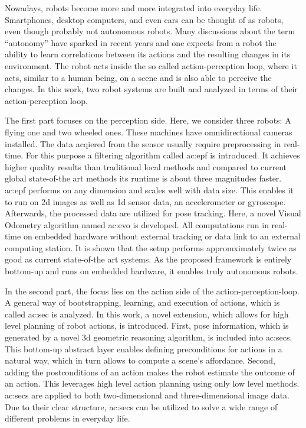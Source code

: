 Nowadays, robots become more and more integrated into everyday life.
Smartphones, desktop computers, and even cars can be thought of as robots, even though probably not autonomous robots.
Many discussions about the term ``autonomy'' have sparked in recent years and one expects from a robot the ability to learn correlations between its actions and the resulting changes in its environment.
The robot acts inside the so called action-perception loop, where it acts, similar to a human being, on a scene and is also able to perceive the changes.
In this work, two robot systems are built and analyzed in terms of their action-perception loop.

The first part focuses on the perception side.
Here, we consider three robots: A flying one and two wheeled ones.
These machines have omnidirectional cameras installed.
The data acqiered from the sensor usually require preprocessing in real-time.
For this purpose a filtering algorithm called \gls{ac:epf} is introduced.
It achieves higher quality results than traditional local methods and compared to current global state-of-the art methods its runtime is about three magnitudes faster.
\gls{ac:epf} performs on any dimension and scales well with data size.
This enables it to run on 2d images as well as 1d sensor data, \eg an accelerometer or gyroscope.
Afterwards, the processed data are utilized for pose tracking.
Here, a novel Visual Odometry algorithm named \gls{ac:evo} is developed.
All computations run in real-time on embedded hardware without external tracking or data link to an external computing station.
It is shown that the setup performs appromximately twice as good as current state-of-the art systems.
As the proposed framework is entirely bottom-up and runs on embedded hardware, it enables truly autonomous robots.

In the second part, the focus lies on the action side of the action-perception-loop.
A general way of bootstrapping, learning, and execution of actions, which is called \gls{ac:sec} is analyzed.
In this work, a novel extension, which allows for high level planning of robot actions, is introduced.
First, pose information, which is generated by a novel 3d geometric reasoning algorithm, is included into \glspl{ac:sec}.
This bottom-up abstract layer enables defining preconditions for actions in a natural way, which in turn allows to compute a scene's affordance.
Second, adding the postconditions of an action makes the robot estimate the outcome of an action.
This leverages high level action planning using only low level methods.
\glspl{ac:sec} are applied to both two-dimensional and three-dimensional image data.
Due to their clear structure, \glspl{ac:sec} can be utilized to solve a wide range of different problems in everyday life.


